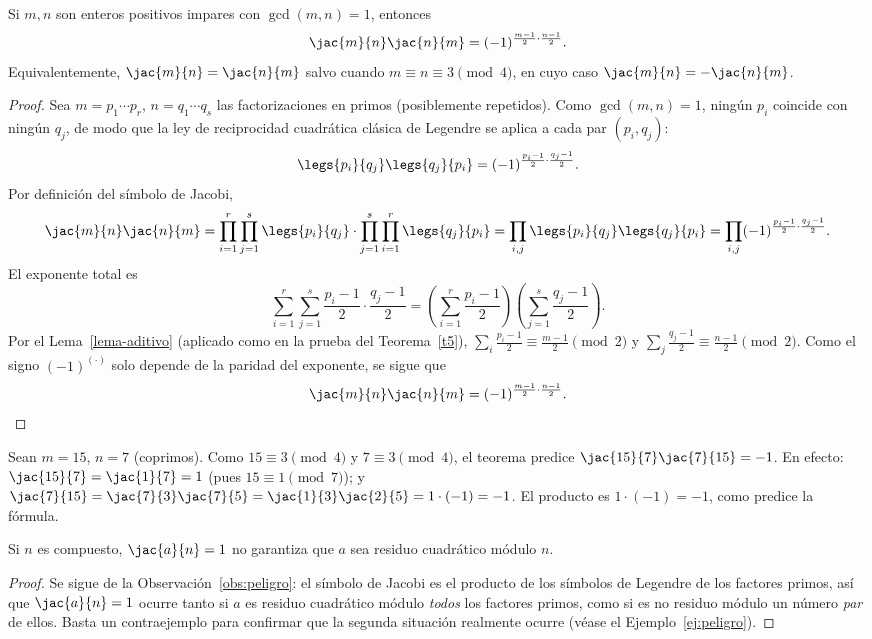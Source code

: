 \begin{teorema}\label{t7}
Si $m,n$ son enteros positivos impares con $\gcd(m,n)=1$, entonces
\[
\jac{m}{n}\jac{n}{m}=(-1)^{\frac{m-1}{2}\cdot\frac{n-1}{2}}.
\]
Equivalentemente, $\jac{m}{n}=\jac{n}{m}$ salvo cuando $m\equiv n\equiv3\pmod4$, en cuyo caso $\jac{m}{n}=-\jac{n}{m}$.
\end{teorema}
\begin{proof}
Sea $m=p_1\cdots p_r$, $n=q_1\cdots q_s$ las factorizaciones en primos (posiblemente repetidos). Como $\gcd(m,n)=1$, ningún $p_i$ coincide con ningún $q_j$, de modo que la ley de reciprocidad cuadrática clásica de Legendre se aplica a cada par $(p_i,q_j)$:
\[
\legs{p_i}{q_j}\legs{q_j}{p_i}=(-1)^{\frac{p_i-1}{2}\cdot\frac{q_j-1}{2}}.
\]
Por definición del símbolo de Jacobi,
\[
\jac{m}{n}\jac{n}{m}=\prod_{i=1}^r\prod_{j=1}^s\legs{p_i}{q_j}\cdot\prod_{j=1}^s\prod_{i=1}^r\legs{q_j}{p_i}=\prod_{i,j}\legs{p_i}{q_j}\legs{q_j}{p_i}=\prod_{i,j}(-1)^{\frac{p_i-1}{2}\cdot\frac{q_j-1}{2}}.
\]
El exponente total es
\[
\sum_{i=1}^r\sum_{j=1}^s\frac{p_i-1}{2}\cdot\frac{q_j-1}{2}=\left(\sum_{i=1}^r\frac{p_i-1}{2}\right)\left(\sum_{j=1}^s\frac{q_j-1}{2}\right).
\]
Por el Lema~\ref{lema-aditivo} (aplicado como en la prueba del Teorema~\ref{t5}), $\sum_i\frac{p_i-1}{2}\equiv\frac{m-1}{2}\pmod2$ y $\sum_j\frac{q_j-1}{2}\equiv\frac{n-1}{2}\pmod2$. Como el signo $(-1)^{(\cdot)}$ solo depende de la paridad del exponente, se sigue que
\[
\jac{m}{n}\jac{n}{m}=(-1)^{\frac{m-1}{2}\cdot\frac{n-1}{2}}. \qedhere
\]
\end{proof}

\begin{ejemplo}
Sean $m=15$, $n=7$ (coprimos). Como $15\equiv3\pmod4$ y $7\equiv3\pmod4$, el teorema predice $\jac{15}{7}\jac{7}{15}=-1$. En efecto: $\jac{15}{7}=\jac{1}{7}=1$ (pues $15\equiv1\pmod7$); y $\jac{7}{15}=\jac{7}{3}\jac{7}{5}=\jac{1}{3}\jac{2}{5}=1\cdot(-1)=-1$. El producto es $1\cdot(-1)=-1$, como predice la fórmula.
\end{ejemplo}

\begin{corolario}\label{cor-peligro}
Si $n$ es compuesto, $\jac{a}{n}=1$ no garantiza que $a$ sea residuo cuadrático módulo $n$.
\end{corolario}
\begin{proof}
Se sigue de la Observación~\ref{obs:peligro}: el símbolo de Jacobi es el producto de los símbolos de Legendre de los factores primos, así que $\jac{a}{n}=1$ ocurre tanto si $a$ es residuo cuadrático módulo \emph{todos} los factores primos, como si es no residuo módulo un número \emph{par} de ellos. Basta un contraejemplo para confirmar que la segunda situación realmente ocurre (véase el Ejemplo~\ref{ej:peligro}).
\end{proof}

